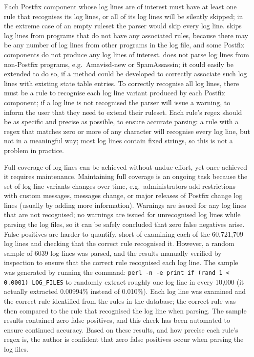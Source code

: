 Each Postfix component whose log lines are of interest must have at least
one rule that recognises its log lines, or all of its log lines will be
silently skipped; in the extreme case of an empty ruleset the parser would
skip every log line.  \parsername{} skips log lines from programs that do
not have any associated rules, because there may be any number of log lines
from other programs in the log file, and some Postfix components do not
produce any log lines of interest.  \parsername{} does not parse log lines
from non-Postfix programs, e.g.\ Amavisd-new or SpamAssassin; it could
easily be extended to do so, if a method could be developed to correctly
associate such log lines with existing state table entries.  To correctly
recognise all log lines, there must be a rule to recognise each log line
variant produced by each Postfix component; if a log line is not recognised
the parser will issue a warning, to inform the user that they need to
extend their ruleset.  Each rule's regex should be as specific and precise
as possible, to ensure accurate parsing: a rule with a regex that matches
zero or more of any character will recognise every log line, but not in a
meaningful way; most log lines contain fixed strings, so this is not a
problem in practice.

Full coverage of log lines can be achieved without undue effort, yet once
achieved it requires maintenance.  Maintaining full coverage is an ongoing
task because the set of log line variants changes over time, e.g.\
administrators add restrictions with custom messages, 
messages change, or major releases of Postfix change log lines (usually by
adding more information).  Warnings are issued for any log lines that are
not recognised; no warnings are issued for unrecognised log lines while
parsing the \numberOFlogFILES{} log files, so it can be safely concluded
that zero false negatives arise.  False positives are harder to quantify,
short of examining each of the 60,721,709 log lines and checking that the
correct rule recognised it.  However, a random sample of 6039 log lines was
parsed, and the results manually verified by inspection to ensure that the
correct rule recognised each log line.  The sample was generated by running
the command: \newline{} \tab{} \texttt{perl -n -e \singlequote{}print if
(rand 1 < 0.0001)\singlequote{} LOG\_FILES} \newline{} to randomly extract
roughly one log line in every 10,000 (it actually extracted 0.00994\%
instead of 0.010\%).  Each log line was examined and the correct rule
identified from the \numberOFrules{} rules in the database; the correct
rule was then compared to the rule that recognised the log line when
parsing.  The sample results contained zero false positives, and this check
has been automated to ensure continued accuracy.  Based on these results,
and how precise each rule's regex is, the author is confident that zero
false positives occur when parsing the \numberOFlogFILES{} log files.

